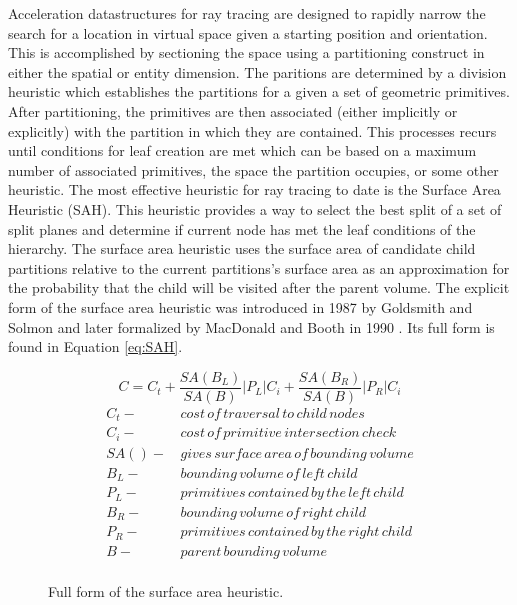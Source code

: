 \documentclass[12pt, a4paper]{article}
\begin{document}
Acceleration datastructures for ray tracing are designed to rapidly narrow the search for a location in virtual space given a starting position and orientation. This is accomplished by sectioning the space using a partitioning construct in either the spatial or entity dimension. The paritions are determined by a division heuristic which establishes the partitions for a given a set of geometric primitives. After partitioning, the primitives are then associated (either implicitly or explicitly) with the partition in which they are contained. This processes recurs until conditions for leaf creation are met which can be based on a maximum number of associated primitives, the space the partition occupies, or some other heuristic. The most effective heuristic for ray tracing to date is the Surface Area Heuristic (SAH). This heuristic provides a way to select the best split of a set of split planes and determine if current node has met the leaf conditions of the hierarchy. The surface area heuristic uses the surface area of candidate child partitions relative to the current partitions's surface area as an approximation for the probability that the child will be visited after the parent volume. The explicit form of the surface area heuristic was introduced in 1987 by Goldsmith and Solmon \cite{goldsmith_1987} and later formalized by MacDonald and Booth in 1990 \cite{macdonald_1990}. Its full form is found in Equation \ref{eq:SAH}.


\begin{figure}[H]
  \begin{equation}
    C =  C_{t} + \frac{SA(B_{L})}{SA(B)} |P_{L}|C_{i} +  \frac{SA(B_{R})}{SA(B)} |P_{R}|C_{i}
    \label{eq:SAH}
  \end{equation}
  \begin{align*}
    C_{t} - & \,cost\, of\, traversal\, to\, child\, nodes \\
    C_{i} - & \, cost\, of\, primitive\, intersection\, check\, \\
    SA() - & \, gives\, surface\, area\, of\, bounding\, volume \\
    B_{L} - &  \, bounding\, volume\, of\, left\, child \\
    P_{L} - & \, primitives\, contained\, by\, the\, left\, child  \\
    B_{R} - & \, bounding\, volume\, of\, right\, child \\
    P_{R} - & \, primitives\, contained\, by\, the\, right\, child \\
    B - & \, parent\, bounding\, volume \\
  \end{align*}
  \caption{Full form of the surface area heuristic.}
  \label{fig:SAH}
\end{figure}
\end{document}
